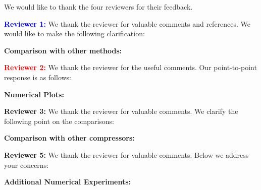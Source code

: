 \documentclass{article}
\begin{document}
We would like to thank the four reviewers for their feedback. 

\textbf{\textcolor{blue}{Reviewer 1:}} We thank the reviewer for valuable comments and references. We would like to make the following clarification:\vspace{-5pt}

\textbf{Comparison with other methods:} 

\textbf{\textcolor{red}{Reviewer 2:}} We thank the reviewer for the useful comments. Our point-to-point response is as follows:\vspace{-5pt}

\textbf{Numerical Plots:} 


\textbf{\textcolor{yellow!50!black}{Reviewer 3:}} We thank the reviewer for valuable comments. We clarify the following point on the comparisons:\vspace{-5pt}

\textbf{Comparison with other compressors:} 





\textbf{\textcolor{green!50!black}{Reviewer 5:}} We thank the reviewer for valuable comments. Below we address your concerns:\vspace{-5pt}

\textbf{Additional Numerical Experiments:} 
\end{document}
